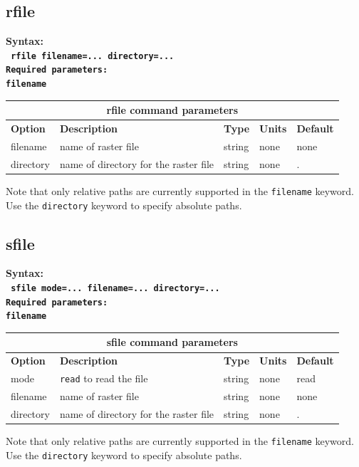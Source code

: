 \documentclass[11pt]{report}
\begin{document}
\subsection{rfile}
\label{keyword:rfile}
\begin{flushleft}\bf
Syntax:\\
\tt
rfile filename=... directory=...\\
\bf Required parameters:\\
\tt filename
\end{flushleft}
%
\begin{center}
\begin{tabular}{|l|p{8cm}|l|l||l|} \hline
\multicolumn{5}{|c|}{\bf rfile command parameters}\\ \hline
{\bf Option} & {\bf Description}                        & {\bf Type} & {\bf Units} & {\bf Default} \\ \hline 
\hline
filename      & name of raster file                     & string  & none & none \\ \hline
directory     & name of directory for the raster file   & string  & none & . \\ \hline
\end{tabular}
\end{center}
Note that only relative paths are currently supported in the \verb+filename+ keyword. Use the
\verb+directory+ keyword to specify absolute paths.


%
\subsection{sfile}
\label{keyword:sfile}
\begin{flushleft}\bf
Syntax:\\
\tt
sfile mode=... filename=... directory=...\\
\bf Required parameters:\\
\tt filename
\end{flushleft}
%
\begin{center}
\begin{tabular}{|l|p{8cm}|l|l||l|} \hline
\multicolumn{5}{|c|}{\bf sfile command parameters}\\ \hline
{\bf Option} & {\bf Description}                        & {\bf Type} & {\bf Units} & {\bf Default} \\ \hline 
\hline
mode      & \verb+read+ to read the file                    & string  & none &
  read
\\ \hline
\hline
filename      & name of raster file                     & string  & none & none \\ \hline
directory     & name of directory for the raster file   & string  & none & . \\ \hline
\end{tabular}
\end{center}
Note that only relative paths are currently supported in the \verb+filename+ keyword. Use the
\verb+directory+ keyword to specify absolute paths.
\end{document}
